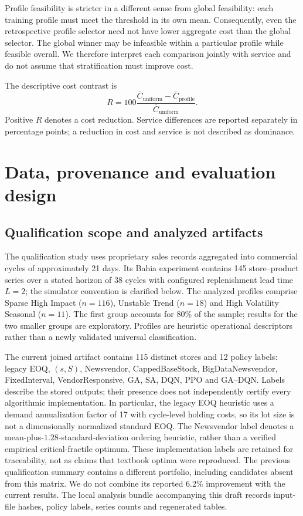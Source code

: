 \documentclass[preprint,12pt]{elsarticle}
\begin{document}
Profile feasibility is stricter in a different sense from global feasibility: each training profile must meet the threshold in its own mean. Consequently, even the retrospective profile selector need not have lower aggregate cost than the global selector. The global winner may be infeasible within a particular profile while feasible overall. We therefore interpret each comparison jointly with service and do not assume that stratification must improve cost.

The descriptive cost contrast is
\begin{equation}
 R=100\frac{\bar C_{\mathrm{uniform}}-\bar C_{\mathrm{profile}}}{\bar C_{\mathrm{uniform}}}.
\end{equation}
Positive $R$ denotes a cost reduction. Service differences are reported separately in percentage points; a reduction in cost and service is not described as dominance.

\section{Data, provenance and evaluation design}
\subsection{Qualification scope and analyzed artifacts}
The qualification study uses proprietary sales records aggregated into commercial cycles of approximately 21 days. Its Bahia experiment contains 145 store--product series over a stated horizon of 38 cycles with configured replenishment lead time $L=2$; the simulator convention is clarified below. The analyzed profiles comprise Sparse High Impact ($n=116$), Unstable Trend ($n=18$) and High Volatility Seasonal ($n=11$). The first group accounts for 80\% of the sample; results for the two smaller groups are exploratory. Profiles are heuristic operational descriptors rather than a newly validated universal classification.

The current joined artifact contains 115 distinct stores and 12 policy labels: legacy EOQ, $(s,S)$, Newsvendor, CappedBaseStock, BigDataNewsvendor, FixedInterval, VendorResponsive, GA, SA, DQN, PPO and GA--DQN. Labels describe the stored outputs; their presence does not independently certify every algorithmic implementation. In particular, the legacy EOQ heuristic uses a demand annualization factor of 17 with cycle-level holding costs, so its lot size is not a dimensionally normalized standard EOQ. The Newsvendor label denotes a mean-plus-$1.28$-standard-deviation ordering heuristic, rather than a verified empirical critical-fractile optimum. These implementation labels are retained for traceability, not as claims that textbook optima were reproduced. The previous qualification summary contains a different portfolio, including candidates absent from this matrix. We do not combine its reported 6.2\% improvement with the current results. The local analysis bundle accompanying this draft records input-file hashes, policy labels, series counts and regenerated tables.
\end{document}

